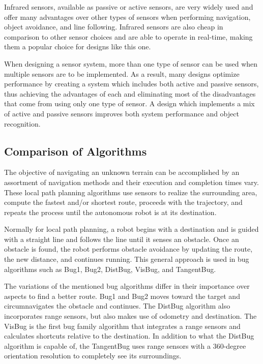 Infrared sensors, available as passive or active sensors, are very widely used and offer many advantages over other types of sensors when performing navigation, object avoidance, and line following.  Infrared sensors are also cheap in comparison to other sensor choices and are able to operate in real-time, making them a popular choice for designs like this one. \cite{Calin}

When designing a sensor system, more than one type of sensor can be used when multiple sensors are to be implemented.  As a result, many designs optimize performance by creating a system which includes both active and passive sensors, thus achieving the advantages of each and eliminating most of the disadvantages that come from using only one type of sensor.  A design which implements a mix of active and passive sensors improves both system performance and object recognition. \cite{Discant}  

\subsection*{Comparison of Algorithms}
The objective of navigating an unknown terrain can be accomplished by an assortment of navigation methods and their execution and completion times vary. These local path planning algorithms use sensors to realize the surrounding area, compute the fastest and/or shortest route, proceeds with the trajectory, and repeats the process until the autonomous robot is at its destination.

Normally for local path planning, a robot begins with a destination and is guided with a straight line and follows the line until it senses an obstacle. Once an obstacle is found, the robot performs obstacle avoidance by updating the route, the new distance, and continues running. This general approach is used in bug algorithms such as Bug1, Bug2, DistBug, VisBug, and TangentBug.

The variations of the mentioned bug algorithms differ in their importance over aspects to find a better route. Bug1 and Bug2 moves toward the target and circumnavigates the obstacle and continues. The DistBug algorithm also incorporates range sensors, but also makes use of odometry and destination. The VisBug is the first bug family algorithm that integrates a range sensors and calculates shortcuts relative to the destination. In addition to what the DistBug algorithm is capable of, the TangentBug uses range sensors with a 360-degree orientation resolution to completely see its surroundings. \cite{Buniyamin}


